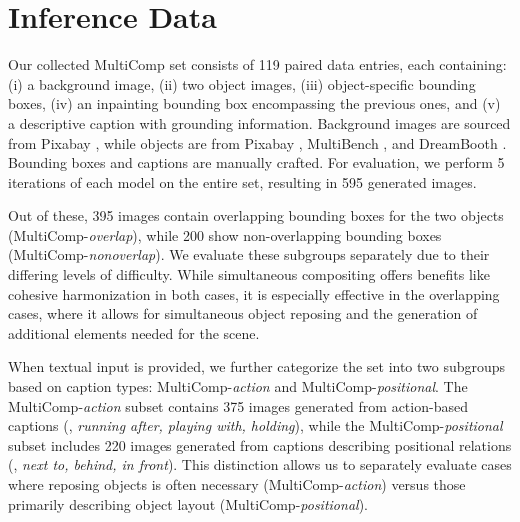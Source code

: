 \section{Inference Data}


Our collected MultiComp set consists of 119 paired data entries, each containing: (i) a background image, (ii) two object images, (iii) object-specific bounding boxes, (iv) an inpainting bounding box encompassing the previous ones, and (v) a descriptive caption with grounding information. Background images are sourced from Pixabay \cite{pixabay}, while objects are from Pixabay \cite{pixabay}, MultiBench \cite{li2024unimo}, and DreamBooth \cite{ruiz2023dreambooth}. Bounding boxes and captions are manually crafted. For evaluation, we perform 5 iterations of each model on the entire set, resulting in 595 generated images.

Out of these, 395 images contain overlapping bounding boxes for the two objects (MultiComp-\textit{overlap}), while 200 show non-overlapping bounding boxes (MultiComp-\textit{nonoverlap}). We evaluate these subgroups separately due to their differing levels of difficulty. While simultaneous compositing offers benefits like cohesive harmonization in both cases, it is especially effective in the overlapping cases, where it allows for simultaneous object reposing and the generation of additional elements needed for the scene. %


When textual input is provided, we further categorize the set into two subgroups based on caption types: MultiComp-\textit{action} and MultiComp-\textit{positional}. The MultiComp-\textit{action} subset contains 375 images generated from action-based captions (\eg, \textit{running after, playing with, holding}), while the MultiComp-\textit{positional} subset includes 220 images generated from captions describing positional relations (\eg, \textit{next to, behind, in front}). This distinction allows us to separately evaluate cases where reposing objects is often necessary (MultiComp-\textit{action}) versus those primarily describing object layout (MultiComp-\textit{positional}).

